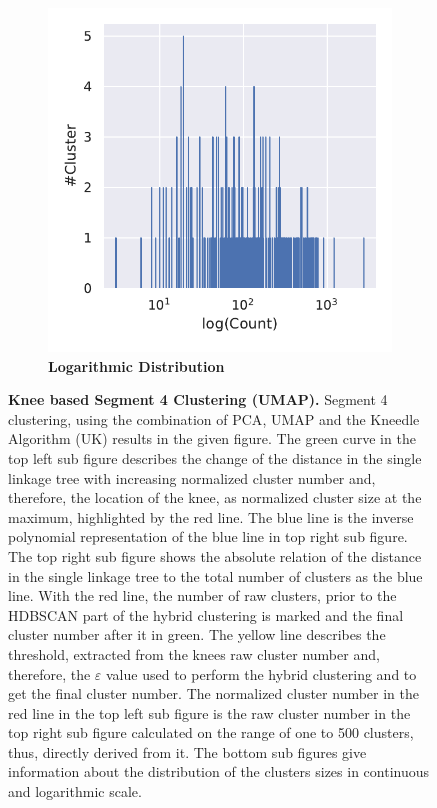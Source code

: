 \begin{figure}[!hbt]
\begin{subfigure}[b]{0.475\textwidth}
    \end{subfigure}
    \hfill
    \begin{subfigure}[b]{0.475\textwidth}
        \caption[Logarithmic Distribution]{\textbf{Logarithmic Distribution}}
        \label{subfig:UMAP_Cluster_Knee_Distribution_log_4}            \includegraphics[width=\textwidth]{UMAP/Cluster_Distribution_Log_Segment_4.pdf}
    \end{subfigure}
    \caption[Knee based Segment 4 Clustering (\Acrshort{UMAP})]{\textbf{Knee based Segment 4 Clustering (\Acrshort{UMAP}).} Segment 4 clustering, using the combination of \gls{PCA}, \gls{UMAP} and the Kneedle Algorithm (UK) results in the given figure. The green curve in the top left sub figure describes the change of the distance in the single linkage tree with increasing normalized cluster number and, therefore, the location of the knee, as normalized cluster size at the maximum, highlighted by the red line. The blue line is the inverse polynomial representation of the blue line in top right sub figure. The top right sub figure shows the absolute relation of the distance in the single linkage tree to the total number of clusters as the blue line. With the red line, the number of raw clusters, prior to the \gls{HDBSCAN} part of the hybrid clustering is marked and the final cluster number after it in green. The yellow line describes the threshold, extracted from the knees raw cluster number and, therefore, the $\varepsilon$ value used to perform the hybrid clustering and to get the final cluster number. The normalized cluster number in the red line in the top left sub figure is the raw cluster number in the top right sub figure calculated on the range of one to 500 clusters, thus, directly derived from it. The bottom sub figures give information about the distribution of the clusters sizes in continuous and logarithmic scale.}
    \label{fig:UMAP_Cluster_Knee_4}
\end{figure}

